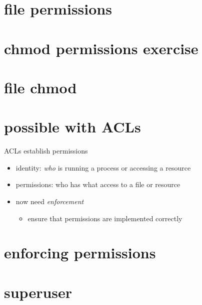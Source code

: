 \section{file permissions}


\section{chmod permissions exercise}


\section{file chmod}


\section{possible with ACLs}


\begin{frame}{ACLs establish permissions}
    \begin{itemize}
        \item identity: \textit{who} is running a process or accessing a resource
        \item permissions: who has what access to a file or resource
        \item now need \textit{enforcement}
            \begin{itemize}
            \item ensure that permissions are implemented correctly
            \end{itemize}
    \end{itemize}
\end{frame}

\section{enforcing permissions}


%

\section{superuser}


